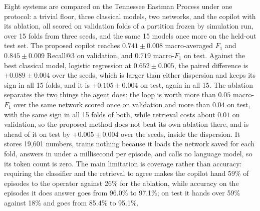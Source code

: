 Eight systems are compared on the Tennessee Eastman Process under one
protocol: a trivial floor, three classical models, two networks, and the
copilot with its ablation, all scored on validation folds of a partition
frozen by simulation run, over 15 folds from three seeds, and the same 15
models once more on the held-out test set. The proposed copilot reaches $0.741
\pm 0.008$ macro-averaged $F_1$ and $0.845 \pm 0.009$ Recall@3 on validation,
and $0.719$ macro-$F_1$ on test. Against the best classical model, logistic
regression at $0.652 \pm 0.005$, the paired difference is $+0.089 \pm 0.004$
over the seeds, which is larger than either dispersion and keeps its sign in
all 15 folds, and it is $+0.105 \pm 0.004$ on test, again in all 15. The
ablation separates the two things the agent does: the loop is worth more than
$0.05$ macro-$F_1$ over the same network scored once on validation and more
than $0.04$ on test, with the same sign in all 15 folds of both, while
retrieval costs about $0.01$ on validation, so the proposed method does not
beat its own ablation there, and is ahead of it on test by $+0.005 \pm 0.004$
over the seeds, inside the dispersion. It stores 19,601 numbers, trains
nothing because it loads the network saved for each fold, answers in under a
millisecond per episode, and calls no language model, so its token count is
zero. The main limitation is coverage rather than accuracy: requiring the
classifier and the retrieval to agree makes the copilot hand 59\% of episodes
to the operator against 26\% for the ablation, while accuracy on the episodes
it does answer goes from 96.0\% to 97.1\%; on test it hands over 59\% against
18\% and goes from 85.4\% to 95.1\%.
